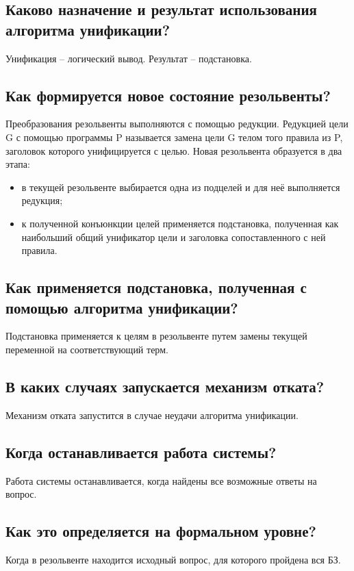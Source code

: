 \subsection*{Каково назначение и результат использования алгоритма унификации?}

Унификация – логический вывод. Результат – подстановка.

\subsection*{Как формируется новое состояние резольвенты?}

Преобразования резольвенты выполняются с помощью редукции. Редукцией цели G с помощью программы P называется замена цели G телом того правила из P, заголовок которого унифицируется с целью. Новая резольвента образуется в два этапа:
\begin{itemize}
    \item в текущей резольвенте выбирается одна из подцелей и для неё выполняется редукция;
    \item к полученной конъюнкции целей применяется подстановка, полученная как наибольший общий унификатор цели и заголовка сопоставленного с ней правила.
\end{itemize}

\subsection*{Как применяется подстановка, полученная с помощью алгоритма унификации?}

Подстановка применяется к целям в резольвенте путем замены текущей переменной на соответствующий терм.

\subsection*{В каких случаях запускается механизм отката?}

Механизм отката запустится в случае неудачи алгоритма унификации.

\subsection*{Когда останавливается работа системы?}

Работа системы останавливается, когда найдены все возможные ответы на вопрос.

\subsection*{Как это определяется на формальном уровне?}

Когда в резольвенте находится исходный вопрос, для которого пройдена вся БЗ.